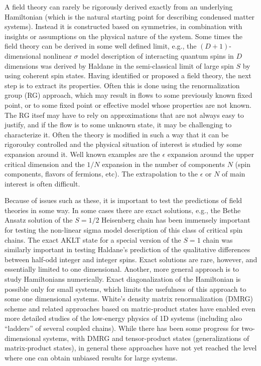 \documentclass[aps,prb,groupedaddress,twocolumn]{revtex4}
\begin{document}
A field theory can rarely be rigorously derived exactly from 
an underlying Hamiltonian (which is the natural starting point for describing condensed matter systems). Instead
it is constructed based on symmetries, in combination with insights or assumptions on the physical nature of the
system. Some times the field theory can be derived in some well defined limit, e.g., the $(D+1)$-dimensional
nonlinear $\sigma$ model description of interacting quantum spins in $D$ dimensions was derived by Haldane in 
the semi-classical limit of large spin $S$ by using coherent spin states. Having identified or proposed a field
theory, the next step is to extract its properties. Often this is done using the renormalization group (RG)
approach, which may result in flows to some previously known fixed point, or to some fixed point or effective
model whose properties are not known. The RG itsef may have to rely on approximations that are not always easy
to justify, and if the flow is to some unknown state, it may be challenging to characterize it. Often the theory
is modified in such a way that it can be rigoroulsy controlled and the physical situation of interest is studied 
by some expansion around it. Well known examples are the $\epsilon$ expansion around the upper critical dimension 
and the $1/N$ expansion in the number of components $N$ (spin components, flavors of fermions, etc). The
extrapolation to the $\epsilon$ or $N$ of main interest is often difficult.

Because of issues such as these, it is important to test the predictions of field theories in some way. In some
cases there are exact solutions, e.g., the Bethe Ansatz solution of the $S=1/2$ Heisenberg chain has been immensely
important for testing the non-linear sigma model description of this class of critical spin chains. The exact
AKLT state for a special version of the $S=1$ chain was similarly important in testing Haldane's prediction of
the qualitative differences between half-odd integer and integer spins. Exact solutions are rare, however, and
essentially limited to one dimensional. Another, more general approach is to study Hamiltonians numerically. Exact
diagonalization of the Hamiltonian is possible only for small systems, which limits the usefulness of this approach 
to some one dimensional systems. White's density matrix renormalization (DMRG) scheme and related approaches based 
on matric-product states have enabled even more detailed studies of the low-energy physics of 1D systems (including
also ``ladders'' of several coupled chains). While there has been some progress for two-dimensional systems, with
DMRG and tensor-product states (generalizations of matrix-product states), in general these approaches have not
yet reached the level where one can obtain unbiased results for large systems.
\end{document}
